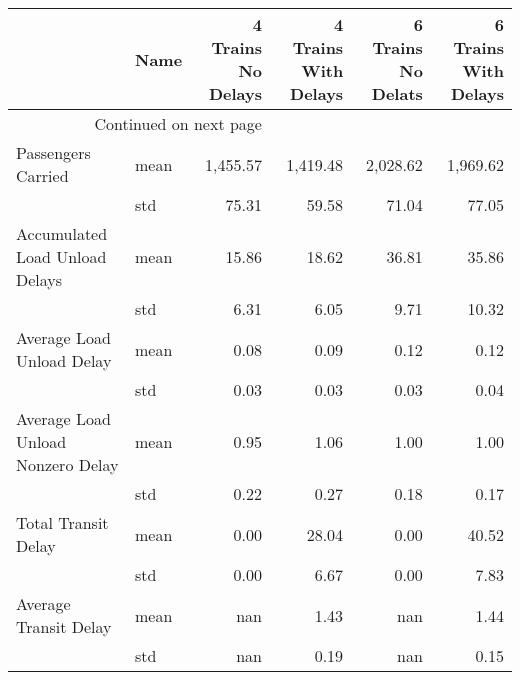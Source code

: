 \begin{longtable}{llrrrr}
\toprule
                   & Name &  4 Trains No Delays &  4 Trains With Delays &  6 Trains No Delats &  6 Trains With Delays \\
\midrule
\endhead
\midrule
\multicolumn{3}{r}{{Continued on next page}} \\
\midrule
\endfoot

\bottomrule
\endlastfoot
Passengers Carried & mean &            1,455.57 &              1,419.48 &            2,028.62 &              1,969.62 \\
                   & std &               75.31 &                 59.58 &               71.04 &                 77.05 \\
Accumulated Load Unload Delays & mean &               15.86 &                 18.62 &               36.81 &                 35.86 \\
                   & std &                6.31 &                  6.05 &                9.71 &                 10.32 \\
Average Load Unload Delay & mean &                0.08 &                  0.09 &                0.12 &                  0.12 \\
                   & std &                0.03 &                  0.03 &                0.03 &                  0.04 \\
Average Load Unload Nonzero Delay & mean &                0.95 &                  1.06 &                1.00 &                  1.00 \\
                   & std &                0.22 &                  0.27 &                0.18 &                  0.17 \\
Total Transit Delay & mean &                0.00 &                 28.04 &                0.00 &                 40.52 \\
                   & std &                0.00 &                  6.67 &                0.00 &                  7.83 \\
Average Transit Delay & mean &                 nan &                  1.43 &                 nan &                  1.44 \\
                   & std &                 nan &                  0.19 &                 nan &                  0.15 \\
\end{longtable}
